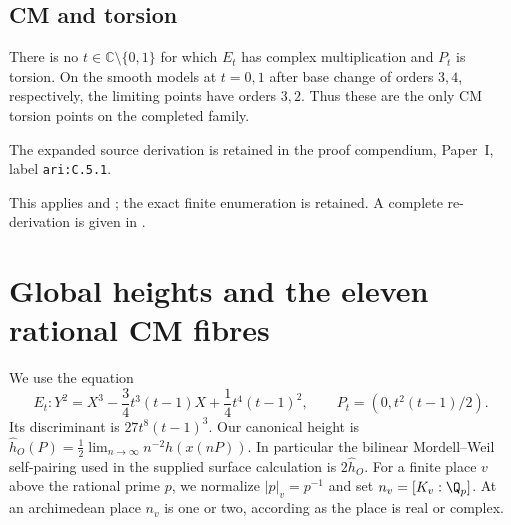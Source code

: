 \subsection{CM and torsion}
\begin{cited}\hypertarget{tag-000U}{}\label{ari:C.5.1}

There is no $t\in\mathbb C\setminus\{0,1\}$ for which $E_t$ has
complex multiplication and $P_t$ is torsion. On the smooth models
at $t=0,1$ after base change of orders $3,4$, respectively, the
limiting points have orders $3,2$. Thus these are the only CM
torsion points on the completed family.
\end{cited}
The expanded source derivation is retained in the proof compendium, Paper~I, label \nolinkurl{ari:C.5.1}.




This applies \citet[Theorem~4.15]{BourdonClarkStankewicz2017} and \citet[Theorem~20.12 and Corollary~20.13]{Sutherland2023CM}; the exact finite enumeration is retained. A complete re-derivation is given in .



\section{Global heights and the eleven rational CM fibres}

We use the equation
\[
 E_t:Y^2=X^3-\frac34t^3(t-1)X+\frac14t^4(t-1)^2,
 \qquad P_t=(0,t^2(t-1)/2).
\]
Its discriminant is $27t^8(t-1)^3$. Our canonical height is
$\widehat h_O(P)=\frac12\lim_{n\to\infty}n^{-2}h(x(nP))$.
In particular the bilinear Mordell--Weil self-pairing used in the
supplied surface calculation is $2\widehat h_O$.
For a finite place $v$ above the rational prime $p$, we normalize
$|p|_v=p^{-1}$ and set $n_v=[K_v:\Q_p]$. At an archimedean
place $n_v$ is one or two, according as the place is real or complex.

